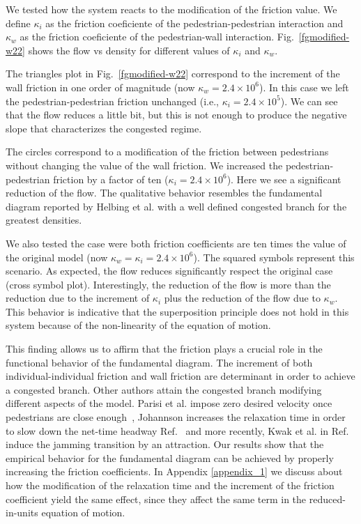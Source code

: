 We tested how the system reacts to the modification of the friction value. We define $\kappa_i$ as the friction coeficiente of the pedestrian-pedestrian interaction and $\kappa_w$ as the friction coeficiente of the pedestrian-wall interaction. Fig.~\ref{fgmodified-w22} shows the flow vs density for different values of $\kappa_i$ and $\kappa_w$.

The triangles plot in Fig.~\ref{fgmodified-w22} correspond to the increment of the wall friction in one order of magnitude (now $\kappa_w = 2.4\times10^{6}$). In this case we left the pedestrian-pedestrian friction unchanged (i.e., $\kappa_i = 2.4\times10^{5}$). We can see that the flow reduces a little bit, but this is not enough to produce the negative slope that characterizes the congested regime. 

The circles correspond to a modification of the friction between pedestrians without changing the value of the wall friction. We increased the pedestrian-pedestrian friction by a factor of ten ($\kappa_i = 2.4\times10^{6}$). Here we see a significant reduction of the flow. The qualitative behavior resembles the fundamental diagram reported by Helbing et al. with a well defined congested branch for the greatest densities.

We also tested the case were both friction coefficients are ten times the value of the original model (now $\kappa_w = \kappa_i = 2.4\times10^{6}$). The squared symbols represent this scenario. As expected, the flow reduces significantly respect the original case (cross symbol plot). Interestingly, the reduction of the flow is more than the reduction due to the increment of $\kappa_i$ plus the reduction of the flow due to $\kappa_w$. This behavior is indicative that the superposition principle does not hold in this system because of the non-linearity of the equation of motion.   

This finding allows us to affirm that the friction plays a crucial role in the functional behavior of the fundamental diagram. The increment of both individual-individual friction and wall friction are determinant in order to achieve a congested branch. Other authors attain the congested branch modifying different aspects of the model. Parisi et al. impose zero desired velocity once pedestrians are close enough~\cite{parisi2}, Johannson increases the relaxation time in order to slow down the net-time headway Ref.~\cite{johansson} and more recently, Kwak et al. in Ref.~\cite{kwak} induce the jamming transition by an attraction. Our results show that the empirical behavior for the fundamental diagram can be achieved by properly increasing the friction coefficients. In Appendix \ref{appendix_1} we discuss about how the modification of the relaxation time and the increment of the friction coefficient yield the same effect, since they affect the same term in the reduced-in-units equation of motion.  


